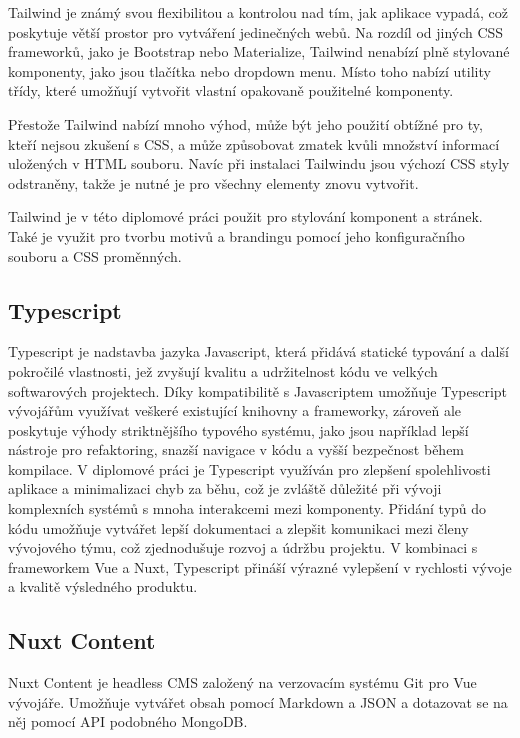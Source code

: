 Tailwind je známý svou flexibilitou a kontrolou nad tím, jak aplikace vypadá, což poskytuje větší prostor pro vytváření jedinečných webů. Na rozdíl od jiných CSS frameworků, jako je Bootstrap nebo Materialize, Tailwind nenabízí plně stylované komponenty, jako jsou tlačítka nebo dropdown menu. Místo toho nabízí utility třídy, které umožňují vytvořit vlastní opakovaně použitelné komponenty.

Přestože Tailwind nabízí mnoho výhod, může být jeho použití obtížné pro ty, kteří nejsou zkušení s CSS, a může způsobovat zmatek kvůli množství informací uložených v HTML souboru. Navíc při instalaci Tailwindu jsou výchozí CSS styly odstraněny, takže je nutné je pro všechny elementy znovu vytvořit.

Tailwind je v této diplomové práci použit pro stylování komponent a stránek. Také je využit pro tvorbu motivů a brandingu pomocí jeho konfiguračního souboru a CSS proměnných.

\subsection{Typescript}
Typescript je nadstavba jazyka Javascript, která přidává statické typování a další pokročilé vlastnosti, jež zvyšují kvalitu a udržitelnost kódu ve velkých softwarových projektech. Díky kompatibilitě s Javascriptem umožňuje Typescript vývojářům využívat veškeré existující knihovny a frameworky, zároveň ale poskytuje výhody striktnějšího typového systému, jako jsou například lepší nástroje pro refaktoring, snazší navigace v kódu a vyšší bezpečnost během kompilace. V diplomové práci je Typescript využíván pro zlepšení spolehlivosti aplikace a minimalizaci chyb za běhu, což je zvláště důležité při vývoji komplexních systémů s mnoha interakcemi mezi komponenty. Přidání typů do kódu umožňuje vytvářet lepší dokumentaci a zlepšit komunikaci mezi členy vývojového týmu, což zjednodušuje rozvoj a údržbu projektu. V kombinaci s frameworkem Vue a Nuxt, Typescript přináší výrazné vylepšení v rychlosti vývoje a kvalitě výsledného produktu. \cite{Typescript}


\subsection{Nuxt Content}
Nuxt Content je headless CMS založený na verzovacím systému Git pro Vue vývojáře. Umožňuje vytvářet obsah pomocí Markdown a JSON a dotazovat se na něj pomocí API podobného MongoDB. \cite{NuxtContent}

